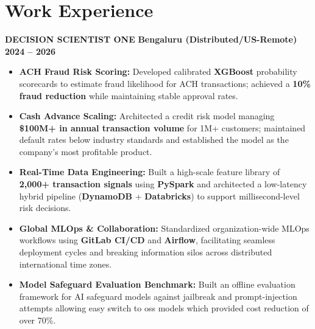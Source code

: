 \documentclass[10pt, letterpaper]{article}
\begin{document}
\section*{Work Experience}

\noindent
\textbf{DECISION SCIENTIST \textbar{} ONE} \hfill \textbf{Bengaluru (Distributed/US-Remote) \textbar{} 2024 -- 2026}
\begin{itemize}[leftmargin=0.25in, itemsep=1pt]
    \item \textbf{ACH Fraud Risk Scoring:} Developed calibrated \textbf{XGBoost} probability scorecards to estimate fraud likelihood for ACH transactions; achieved a \textbf{10\% fraud reduction} while maintaining stable approval rates.
    \item \textbf{Cash Advance Scaling:} Architected a credit risk model managing \textbf{\$100M+ in annual transaction volume} for 1M+ customers; maintained default rates below industry standards and established the model as the company's most profitable product.
    \item \textbf{Real-Time Data Engineering:} Built a high-scale feature library of \textbf{2,000+ transaction signals} using \textbf{PySpark} and architected a low-latency hybrid pipeline (\textbf{DynamoDB} + \textbf{Databricks}) to support millisecond-level risk decisions.
    \item \textbf{Global MLOps \& Collaboration:} Standardized organization-wide MLOps workflows using \textbf{GitLab CI/CD} and \textbf{Airflow}, facilitating seamless deployment cycles and breaking information silos across distributed international time zones.
    \item \textbf{Model Safeguard Evaluation Benchmark:} Built an offline evaluation framework for AI safeguard models against jailbreak and prompt-injection attempts allowing easy switch to oss models which provided cost reduction of over 70\%.
\end{itemize}

\vspace{1ex}
\end{document}
